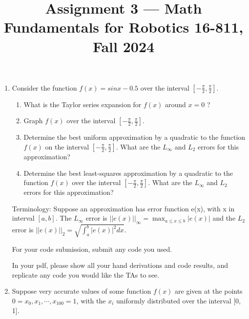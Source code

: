 \documentclass[conference,onecolumn]{IEEEtran}
\begin{document}
\title{\Large Assignment 3 --- Math Fundamentals for Robotics 16-811, Fall 2024}

\author{
}

\maketitle

\begin{enumerate}[label=\arabic{enumi}.]
    \item Consider the function $f (x) = sin x - 0.5$ over the interval $[-\frac{\pi}{2}, \frac{\pi}{2}]$.
          \begin{enumerate}
              \item What is the Taylor series expansion for $f (x)$ around $x = 0$ ?
              \item Graph $f (x)$ over the interval $[-\frac{\pi}{2}, \frac{\pi}{2}]$.
              \item Determine the best uniform approximation by a quadratic to the function $f (x)$ on the interval $[-\frac{\pi}{2}, \frac{\pi}{2}]$.
                    What are the $L_{\infty}$ and $L_2$ errors for this approximation?
              \item Determine the best least-squares approximation by a quadratic to the function $f (x)$ over the interval $[-\frac{\pi}{2}, \frac{\pi}{2}]$.
                    What are the $L_{\infty}$ and $L_2$ errors for this approximation?
          \end{enumerate}
          Terminology: Suppose an approximation has error function e(x), with x in interval $[a, b]$.
          The $L_{\infty}$ error is $||e(x)||_{\infty} = \max_{a \leq x \leq b} |e(x)|$ and the $L_2$ error is $||e(x)||_2 = \sqrt{\int_a^b |e(x)|^2 dx}$.

          For your code submission, submit any code you used.

          In your pdf, please show all your hand derivations and code results, and replicate any code you would like the TAs to see.

    \item Suppose very accurate values of some function $f (x)$ are given at the points $0 = x_0, x_1, \cdots , x_100 = 1$, with the ${x_i}$ uniformly distributed over the interval [0, 1].


\end{enumerate}
\end{document}
